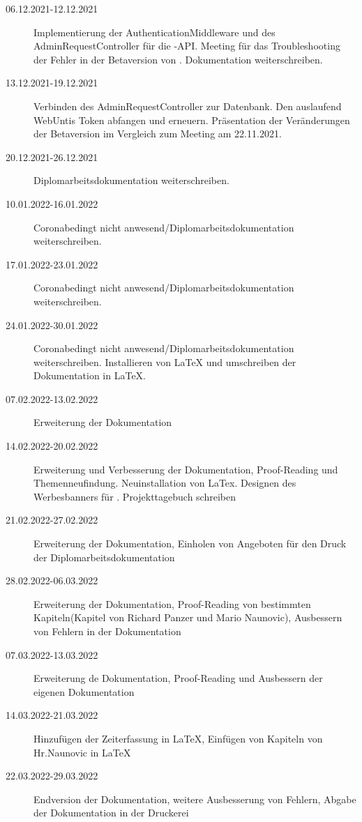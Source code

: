 \begin{description}
    \item[06.12.2021-12.12.2021] Implementierung der AuthenticationMiddleware und des AdminRequestController für die \ZELIA-API. Meeting für das Troubleshooting der Fehler in der Betaversion von \ZELIA. Dokumentation weiterschreiben. 
    \item[13.12.2021-19.12.2021] Verbinden des AdminRequestController zur Datenbank. Den auslaufend WebUntis Token abfangen und erneuern. Präsentation der Veränderungen der Betaversion im Vergleich zum Meeting am 22.11.2021.
    \item[20.12.2021-26.12.2021] Diplomarbeitsdokumentation weiterschreiben.
    \item[10.01.2022-16.01.2022] Coronabedingt nicht anwesend/Diplomarbeitsdokumentation weiterschreiben.
    \item[17.01.2022-23.01.2022] Coronabedingt nicht anwesend/Diplomarbeitsdokumentation weiterschreiben.
    \item[24.01.2022-30.01.2022] Coronabedingt nicht anwesend/Diplomarbeitsdokumentation weiterschreiben. Installieren von LaTeX und umschreiben der Dokumentation in LaTeX.
    \item[07.02.2022-13.02.2022] Erweiterung der Dokumentation
    \item[14.02.2022-20.02.2022] Erweiterung und Verbesserung der Dokumentation, Proof-Reading und Themenneufindung. Neuinstallation von LaTex. Designen des Werbesbanners für \ZELIA. Projekttagebuch schreiben
    \item[21.02.2022-27.02.2022] Erweiterung der Dokumentation, Einholen von Angeboten für den Druck der Diplomarbeitsdokumentation
    \item[28.02.2022-06.03.2022] Erweiterung der Dokumentation, Proof-Reading von bestimmten Kapiteln(Kapitel von Richard Panzer und Mario Naunovic), Ausbessern von Fehlern in der Dokumentation
    \item[07.03.2022-13.03.2022] Erweiterung de Dokumentation, Proof-Reading und Ausbessern der eigenen Dokumentation
    \item[14.03.2022-21.03.2022] Hinzufügen der Zeiterfassung in LaTeX, Einfügen von Kapiteln von Hr.Naunovic in LaTeX
    \item[22.03.2022-29.03.2022] Endversion der Dokumentation, weitere Ausbesserung von Fehlern, Abgabe der Dokumentation in der Druckerei
\end{description}